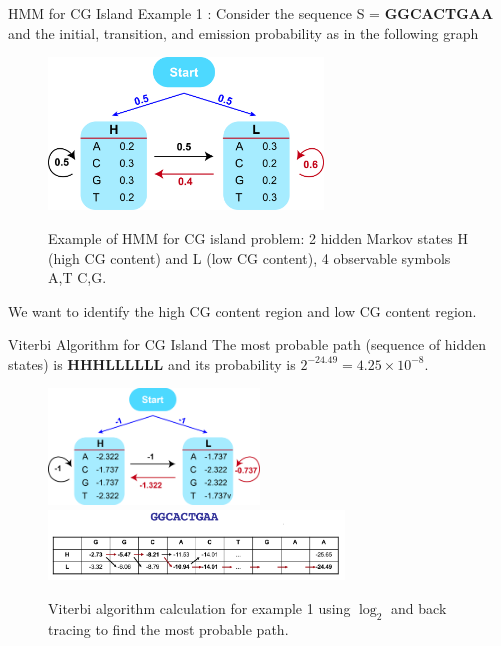 \documentclass{beamer}
\begin{document}
\begin{frame}{HMM for CG Island}
	Example 1 \cite{borodovsky2006problems}: Consider the sequence S = \textbf{GGCACTGAA} and the initial, transition, and emission probability as in the following graph
	\begin{figure}
		\centering
		\includegraphics[width = 0.65\textwidth]{example1.jpg}
		\label{fig:example1}
		\caption{Example of HMM for CG island problem: 2 hidden Markov states H (high CG content) and L (low CG content), 4 observable symbols A,T C,G.}
	\end{figure}
	We want to identify the high CG content region and low CG content region.
\end{frame} 

\begin{frame}{Viterbi Algorithm for CG Island}
	 The most probable path (sequence of hidden states) is \textbf{HHHLLLLLL} and its probability is $2^{-24.49} = 4.25 \times 10^{-8}$.
	\begin{figure}
		\centering
		\includegraphics[width = 0.5\textwidth]{example1log.jpg}
		\includegraphics[width = 0.7\textwidth]{example1cal.png}
		\label{fig:example2cal}
		\caption{Viterbi algorithm calculation for example 1 using $\log_2$ and back tracing to find the most probable path.}
	\end{figure}
\end{frame}
\end{document}
